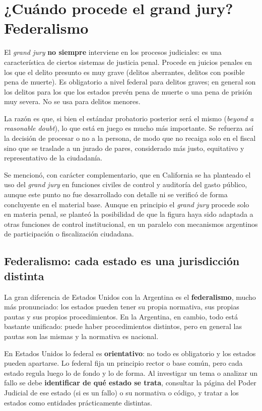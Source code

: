 \documentclass[12pt,oneside]{book}
\begin{document}
\section{¿Cuándo procede el grand jury? Federalismo}

El \textit{grand jury} \textbf{no siempre} interviene en los procesos judiciales: es una característica de ciertos sistemas de justicia penal. Procede en juicios penales en los que el delito presunto es muy grave (delitos aberrantes, delitos con posible pena de muerte). Es obligatorio a nivel federal para delitos graves; en general son los delitos para los que los estados prevén pena de muerte o una pena de prisión muy severa. No se usa para delitos menores.

La razón es que, si bien el estándar probatorio posterior será el mismo (\textit{beyond a reasonable doubt}), lo que está en juego es mucho más importante. Se refuerza así la decisión de procesar o no a la persona, de modo que no recaiga solo en el fiscal sino que se traslade a un jurado de pares, considerado más justo, equitativo y representativo de la ciudadanía.

Se mencionó, con carácter complementario, que en California se ha planteado el uso del \textit{grand jury} en funciones civiles de control y auditoría del gasto público, aunque este punto no fue desarrollado con detalle ni se verificó de forma concluyente en el material base.
Aunque en principio el \textit{grand jury} procede solo en materia penal, se planteó la posibilidad de que la figura haya sido adaptada a otras funciones de control institucional, en un paralelo con mecanismos argentinos de participación o fiscalización ciudadana.

\subsection{Federalismo: cada estado es una jurisdicción distinta}

La gran diferencia de Estados Unidos con la Argentina es el \textbf{federalismo}, mucho más pronunciado: los estados pueden tener su propia normativa, sus propias pautas y sus propios procedimientos. En la Argentina, en cambio, todo está bastante unificado: puede haber procedimientos distintos, pero en general las pautas son las mismas y la normativa es nacional.

\begin{important}
En Estados Unidos lo federal es \textbf{orientativo}: no todo es obligatorio y los estados pueden apartarse. Lo federal fija un principio rector o base común, pero cada estado regula luego lo de fondo y lo de forma. Al investigar un tema o analizar un fallo se debe \textbf{identificar de qué estado se trata}, consultar la página del Poder Judicial de ese estado (si es un fallo) o su normativa o código, y tratar a los estados como entidades prácticamente distintas.
\end{important}
\end{document}

